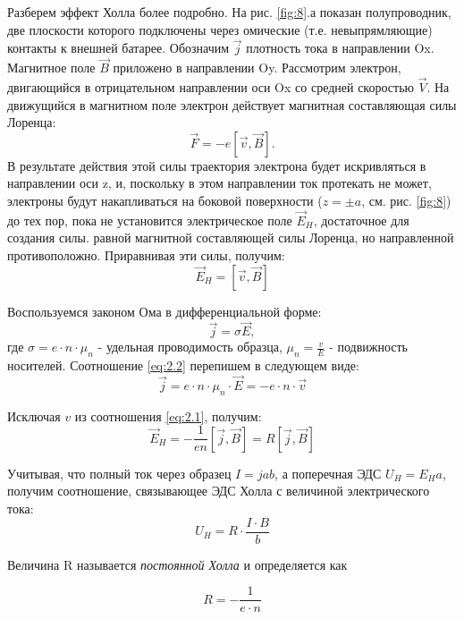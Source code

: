 Разберем эффект Холла более подробно. На рис. \ref{fig:8}.а показан полупроводник, две плоскости которого подключены
через омические (т.е. невыпрямляющие) контакты к внешней батарее. Обозначим $\vec j$ плотность тока в направлении Ox.
Магнитное поле $\vec B$ приложено в направлении Oy. Рассмотрим электрон, двигающийся в отрицательном направлении оси Ox
со средней скоростью $\vec V$. На движущийся в магнитном поле электрон действует магнитная составляющая силы Лоренца:
$$\vec F = -e [\vec v, \vec B].$$
В результате действия этой силы траектория электрона будет искривляться  в направлении оси z, и, поскольку в этом
направлении ток протекать не может, электроны будут накапливаться на боковой поверхности ($z=\pm a$, см. рис.
\ref{fig:8}) до тех пор, пока не установится электрическое поле $\vec E_H$, достаточное для создания силы. равной
магнитной составляющей силы Лоренца, но направленной противоположно. Приравнивая эти силы, получим: 
\begin{equation}
\label{eq:2.1}
	\vec E_H=[\vec v, \vec B]
\end{equation}

Воспользуемся законом Ома в дифференциальной форме:
\begin{equation}
\label{eq:2.2}
	\vec j = \sigma \vec E,
\end{equation}
где $\sigma = e \cdot n \cdot \mu_n$ - удельная проводимость образца, $\mu_n = \frac{v}{E}$ - подвижность носителей. Соотношение \eqref{eq:2.2} перепишем в следующем виде:
\begin{equation}
\label{eq:2.3}
	\vec j = e \cdot n \cdot \mu_n \cdot \vec E = -e \cdot n \cdot \vec v
\end{equation}

Исключая $v$ из соотношения \eqref{eq:2.1}, получим:
\begin{equation}
\label{eq:2.4}
	\vec E_H = -\frac{1}{en} [\vec j, \vec B]=R[\vec j, \vec B]
\end{equation}

Учитывая, что полный ток через образец $I=jab$, а поперечная ЭДС $U_H=E_Ha$, получим соотношение, связывающее ЭДС Холла с величиной электрического тока:
\begin{equation}
\label{eq:2.5}
	U_H=R \cdot \frac{I\cdot B}{b}
\end{equation}

Величина R называется \textit{постоянной Холла} и определяется как

\begin{equation}
\label{eq:2.6}
	R=-\frac{1}{e\cdot n}
\end{equation}


